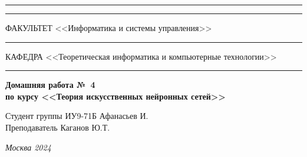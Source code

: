 \documentclass[a4paper, 14pt]{extarticle}
\begin{document}
\begin{titlepage}
\vspace{-25pt}
\hspace{-35pt}\rule{\textwidth}{2.3pt}

\vspace*{-20.3pt}
\hspace{-35pt}\rule{\textwidth}{0.4pt}

\vspace{1.5ex}
\hspace{-35pt} \noindent \small ФАКУЛЬТЕТ\hspace{80pt} <<Информатика и системы управления>>

\vspace*{-16pt}
\hspace{47pt}\rule{0.83\textwidth}{0.4pt}

\vspace{0.5ex}
\hspace{-35pt} \noindent \small КАФЕДРА\hspace{50pt} <<Теоретическая информатика и компьютерные технологии>>

\vspace*{-16pt}
\hspace{30pt}\rule{0.866\textwidth}{0.4pt}
  
\vspace{11em}

\begin{center}
\Large {\bf Домашняя работа №~4} \\ 
\large {\bf по курсу <<Теория искусственных нейронных сетей>>} \\
\end{center}\normalsize

\vspace{8em}

\begin{flushright}
  {Студент группы ИУ9-71Б Афанасьев И. \hspace*{15pt}\\ 
  \vspace{2ex}
  Преподаватель Каганов Ю.Т.\hspace*{15pt}}
\end{flushright}

\bigskip

\vfill
 

\begin{center}
\textsl{Москва 2024}
\end{center}
\end{titlepage}
\end{document}
